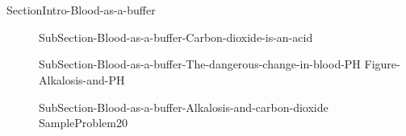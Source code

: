 \documentclass[main.tex]{subfiles}
\newcommand\chapterlabel{Ch-acidbase}\setcounter{figurenewcounter}{0}\setcounter{tablenewcounter}{0}\setcounter{formulanewcounter}{0}\chapterpicture{../{\chapterlabel}/figure1}\chapterpicturelabel{PngImg}
\begin{document}
\section{\color{blue!30!black}{Blood as a buffer}}{SectionIntro-Blood-as-a-buffer}
\sloppy\begin{description}
\item[] {SubSection-Blood-as-a-buffer-Carbon-dioxide-is-an-acid}
\item[] {SubSection-Blood-as-a-buffer-The-dangerous-change-in-blood-PH}
{Figure-Alkalosis-and-PH}
\item[] {SubSection-Blood-as-a-buffer-Alkalosis-and-carbon-dioxide}
{SampleProblem20}
\end{description}
 
\end{document}

